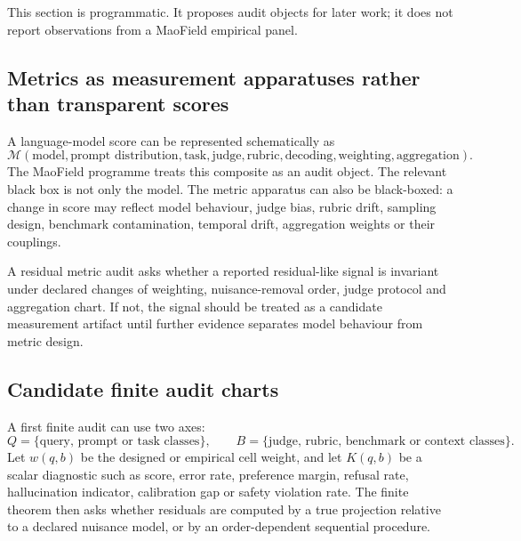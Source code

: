 \documentclass[11pt]{article}
\theoremstyle{remark}
\begin{document}
This section is programmatic. It proposes audit objects for later work; it does not report observations from a MaoField empirical panel.

\subsection{Metrics as measurement apparatuses rather than transparent scores}

A language-model score can be represented schematically as
\[
\mathcal{M}(\text{model},\text{prompt distribution},\text{task},\text{judge},\text{rubric},\text{decoding},\text{weighting},\text{aggregation}).
\]
The MaoField programme treats this composite as an audit object. The relevant black box is not only the model. The metric apparatus can also be black-boxed: a change in score may reflect model behaviour, judge bias, rubric drift, sampling design, benchmark contamination, temporal drift, aggregation weights or their couplings.

A residual metric audit asks whether a reported residual-like signal is invariant under declared changes of weighting, nuisance-removal order, judge protocol and aggregation chart. If not, the signal should be treated as a candidate measurement artifact until further evidence separates model behaviour from metric design.

\subsection{Candidate finite audit charts}

A first finite audit can use two axes:
\[
Q=\{\text{query, prompt or task classes}\},\qquad
B=\{\text{judge, rubric, benchmark or context classes}\}.
\]
Let $w(q,b)$ be the designed or empirical cell weight, and let $K(q,b)$ be a scalar diagnostic such as score, error rate, preference margin, refusal rate, hallucination indicator, calibration gap or safety violation rate. The finite theorem then asks whether residuals are computed by a true projection relative to a declared nuisance model, or by an order-dependent sequential procedure.
\end{document}
